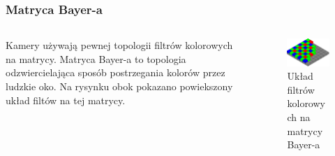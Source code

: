 \documentclass{beamer}
\begin{document}
\begin{frame}
  \frametitle{Matryca Bayer-a}
  
  \begin{columns}
  \begin{column}{5cm}
  Kamery używają pewnej topologii filtrów kolorowych na matrycy. Matryca Bayer-a to topologia odzwiercielająca
  sposób postrzegania kolorów przez ludzkie oko. Na rysynku obok pokazano powiekszony układ
  filtów na tej matrycy.
  \end{column}
  \begin{column}{5cm}
    \begin{center}
    \begin{figure}

	  \includegraphics[width=\textwidth]{bayer_pattern_sensor}
	  \caption{Układ filtrów kolorowych na matrycy Bayer-a}
	  \label{fig:pattern}
    \end{figure}
    \end{center}
	\end{column}
	\end{columns}
	
\end{frame}
\end{document}
